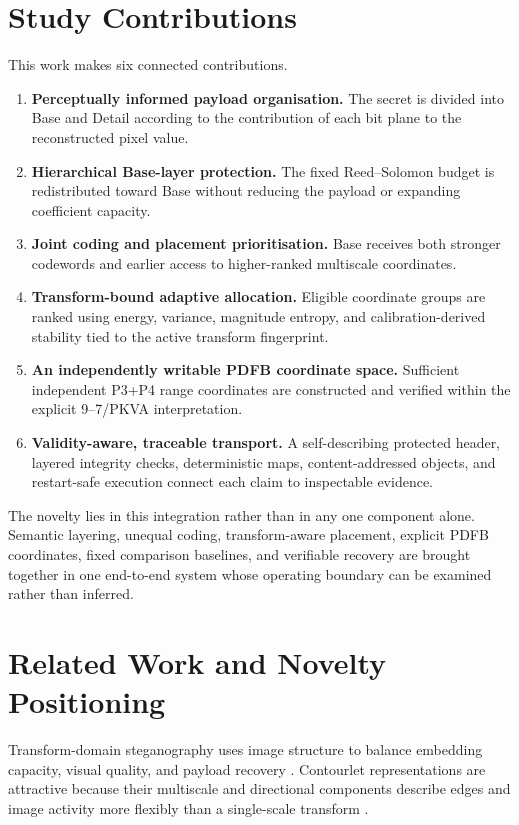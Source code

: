 \section{Study Contributions}

This work makes six connected contributions.

\begin{enumerate}[leftmargin=*,label=\arabic*.]
  \item \textbf{Perceptually informed payload organisation.} The secret is divided into Base and Detail according to the contribution of each bit plane to the reconstructed pixel value.
  \item \textbf{Hierarchical Base-layer protection.} The fixed Reed--Solomon budget is redistributed toward Base without reducing the payload or expanding coefficient capacity.
  \item \textbf{Joint coding and placement prioritisation.} Base receives both stronger codewords and earlier access to higher-ranked multiscale coordinates.
  \item \textbf{Transform-bound adaptive allocation.} Eligible coordinate groups are ranked using energy, variance, magnitude entropy, and calibration-derived stability tied to the active transform fingerprint.
  \item \textbf{An independently writable PDFB coordinate space.} Sufficient independent P3+P4 range coordinates are constructed and verified within the explicit 9--7/PKVA interpretation.
  \item \textbf{Validity-aware, traceable transport.} A self-describing protected header, layered integrity checks, deterministic maps, content-addressed objects, and restart-safe execution connect each claim to inspectable evidence.
\end{enumerate}

The novelty lies in this integration rather than in any one component alone. Semantic layering, unequal coding, transform-aware placement, explicit PDFB coordinates, fixed comparison baselines, and verifiable recovery are brought together in one end-to-end system whose operating boundary can be examined rather than inferred.

\section{Related Work and Novelty Positioning}

Transform-domain steganography uses image structure to balance embedding capacity, visual quality, and payload recovery \citep{Cox2007,Fridrich2009,Petitcolas1999}. Contourlet representations are attractive because their multiscale and directional components describe edges and image activity more flexibly than a single-scale transform \citep{DoVetterli2005}.

